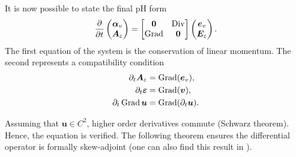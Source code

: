 It is now possible to state the final pH form
\begin{equation}
\diffp{}{t}
\begin{pmatrix}
\bm{\alpha}_v \\
\bm{A}_\varepsilon
\end{pmatrix} = 
\begin{bmatrix}
\bm{0} & \Div \\
\Grad & \bm{0} \\
\end{bmatrix}
\begin{pmatrix}
\bm{e}_v \\
\bm{E}_\varepsilon
\end{pmatrix}.
\end{equation}
The first equation of the system is the conservation of linear momentum. The second represents a compatibility condition 
\begin{equation}\label{eq:compderElas}
\begin{aligned}
\partial_t {\bm{A}_\varepsilon} &= \operatorname*{Grad}(\bm{e}_v), \\
\partial_t\bm{\varepsilon} &= \operatorname*{Grad}(\bm{v}), \\
\partial_t \operatorname*{Grad} \bm{u} &= \operatorname*{Grad}(\partial_t \bm{u}). \\
\end{aligned}
\end{equation}

Assuming that $\bm{u} \in C^2$, higher order derivatives commute (Schwarz theorem). Hence, the equation is verified. The following theorem ensures the differential operator is formally skew-adjoint (one can also find this result in \cite[Lemma 3.3]{pauly2020elasticity}). 

